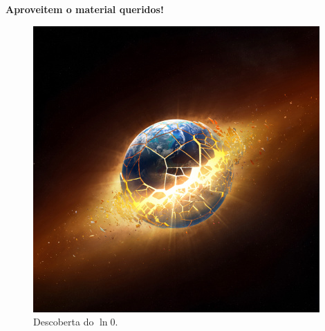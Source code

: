 \documentclass[10pt,a4paper]{article}
\begin{document}
			
\textbf{Aproveitem o material queridos!}

\begin{figure}[h!]
	\centering
	\includegraphics[width=0.25\linewidth]{istockphoto-481013807-170667a}
	\caption{Descoberta do $\ln 0$.}
	\label{fig:istockphoto-481013807-170667a}
\end{figure}

			
			
			
			
			
			
			
			
			
			
			
			
			
			
			
			
			
			
			
			
			
			
			
		
		
		
		
\end{document}
